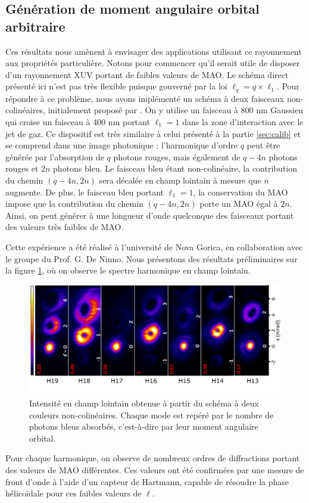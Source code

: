\subsection{Génération de moment angulaire orbital arbitraire}
Ces résultats nous amènent à envisager des applications utilisant ce rayonnement aux propriétés particulière. Notons pour commencer qu'il serait utile de disposer d'un rayonnement XUV portant de faibles valeurs de MAO. Le schéma direct présenté ici n'est pas très flexible puisque gouverné par la loi $\ell_q=q\times\ell_1$. Pour répondre à ce problème, nous avons implémenté un schéma à deux faisceaux non-colinéaires, initialement proposé par . On y utilise un faisceau à 800 nm Gaussien qui croise un faisceau à 400 nm portant $\ell_1 = 1$ dans la zone d'interaction avec le jet de gaz. Ce dispositif est très similaire à celui présenté à la partie \ref{sec:calib} et se comprend dans une image photonique : l'harmonique d'ordre $q$ peut être générée par l'absorption de $q$ photons rouges, mais également de $q-4n$ photons rouges et $2n$ photons bleu. Le faisceau bleu étant non-colinéaire, la contribution du chemin $(q-4n,2n)$ sera décalée en champ lointain à mesure que $n$ augmente. De plus, le faisceau bleu portant $\ell_1=1$, la conservation du MAO impose que la contribution du chemin $(q-4n,2n)$ porte un MAO égal à $2n$. Ainsi, on peut générer à une longueur d'onde quelconque des faisceaux portant des valeurs très faibles de MAO.

Cette expérience a été réalisé à l'université de Nova Gorica, en collaboration avec le groupe du Prof. G. De Ninno. Nous présentons des résultats préliminaires sur la figure \ref{fig:gauthier}, où on observe le spectre harmonique en champ lointain. 

\begin{figure}[!ht]
\centering
\includegraphics[width=0.8\columnwidth]{Figures/Conclusion/gauthier.pdf}%
\caption{Intensité en champ lointain obtenue à partir du schéma à deux couleurs non-colinéaires. Chaque mode est repéré par le nombre de photons bleus absorbés, c'est-à-dire par leur moment angulaire orbital.}
\label{fig:gauthier}
\end{figure}
Pour chaque harmonique, on observe de nombreux ordres de diffractions portant des valeurs de MAO différentes. Ces valeurs ont été confirmées par une mesure de front d'onde à l'aide d'un capteur de Hartmann, capable de résoudre la phase hélicoïdale pour ces faibles valeurs de $\ell$.

